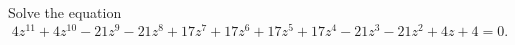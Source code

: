 Solve the equation
\[ 4z^{11} + 4z^{10} - 21z^9 - 21z^8 + 17z^7 + 17z^6 + 17z^5 + 17z^4 - 21z^3 - 21z^2 + 4z + 4 = 0. \]
